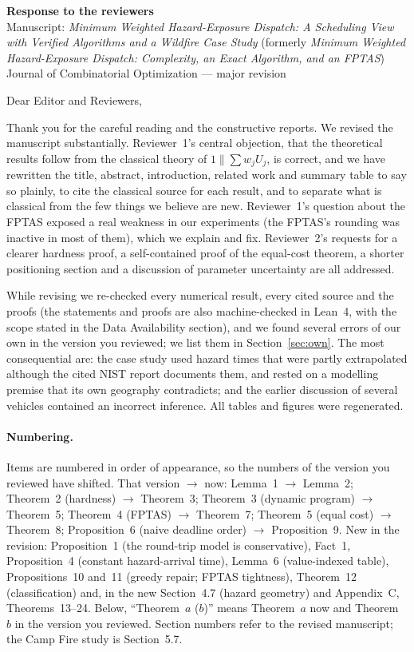 \documentclass[11pt]{article}
\begin{document}
\begin{center}
{\large\bfseries Response to the reviewers}\\[0.3em]
Manuscript: \emph{Minimum Weighted Hazard-Exposure Dispatch: A Scheduling
View with Verified Algorithms and a Wildfire Case Study} (formerly
\emph{Minimum Weighted Hazard-Exposure Dispatch: Complexity, an Exact
Algorithm, and an FPTAS})\\
Journal of Combinatorial Optimization --- major revision
\end{center}

Dear Editor and Reviewers,

Thank you for the careful reading and the constructive reports. We
revised the manuscript substantially. Reviewer~1's central objection,
that the theoretical results follow from the classical theory of
$1\|\sum w_jU_j$, is correct, and we have rewritten the title, abstract,
introduction, related work and summary table to say so plainly, to cite
the classical source for each result, and to separate what is classical
from the few things we believe are new. Reviewer~1's question about the
FPTAS exposed a real weakness in our experiments (the FPTAS's rounding was
inactive in most of them), which we explain and fix. Reviewer~2's
requests for a clearer hardness proof, a self-contained proof of the
equal-cost theorem, a shorter positioning section and a discussion of
parameter uncertainty are all addressed.

While revising we re-checked every numerical result, every cited source and
the proofs (the statements and proofs are also machine-checked in Lean~4,
with the scope stated in the Data Availability section), and we found
several errors of our own in the version you reviewed; we list them in
Section~\ref{sec:own}. The most consequential are: the case study used
hazard times that were partly extrapolated although the cited NIST report
documents them, and rested on a modelling premise that its own geography
contradicts; and the earlier discussion of several vehicles contained an
incorrect inference. All tables and figures were regenerated.

\paragraph{Numbering.} Items are numbered in order of appearance, so the
numbers of the version you reviewed have shifted. That version $\to$ now:
Lemma~1 $\to$ Lemma~2; Theorem~2 (hardness) $\to$ Theorem~3; Theorem~3
(dynamic program) $\to$ Theorem~5; Theorem~4 (FPTAS) $\to$ Theorem~7;
Theorem~5 (equal cost) $\to$ Theorem~8; Proposition~6 (naive deadline
order) $\to$ Proposition~9. New in the revision: Proposition~1 (the
round-trip model is conservative), Fact~1, Proposition~4 (constant
hazard-arrival time), Lemma~6 (value-indexed table), Propositions~10
and~11 (greedy repair; FPTAS tightness), Theorem~12 (classification) and,
in the new Section~4.7 (hazard geometry) and Appendix~C, Theorems~13--24.
Below, ``Theorem~$a$ ($b$)'' means Theorem~$a$ now and Theorem~$b$ in the
version you reviewed. Section numbers refer to the revised manuscript;
the Camp Fire study is Section~5.7.
\end{document}
